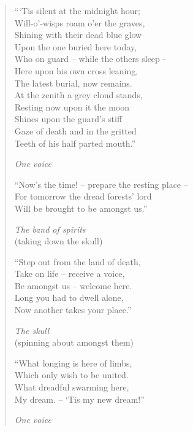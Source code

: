 \begin{verse}
``‘Tis silent at the midnight hour; \\
Will-o’-wisps roam o’er the graves, \\
Shining with their dead blue glow \\
Upon the one buried here today, \\
Who on guard -- while the others sleep - \\
Here upon his own cross leaning, \\
The latest burial, now remains. \\
At the zenith a grey cloud stands, \\
Resting now upon it the moon \\
Shines upon the guard’s stiff \\
Gaze of death and in the gritted \\
Teeth of his half parted mouth.”

\smallskip

\textit{One voice}

\smallskip

``Now’s the time! -- prepare the resting place -- \\
For tomorrow the dread forests’ lord \\
Will be brought to be amongst us.”

\smallskip

\textit{The band of spirits} \\
(taking down the skull) 

\smallskip

``Step out from the land of death, \\
Take on life -- receive a voice, \\
Be amongst us -- welcome here. \\
Long you had to dwell alone, \\
Now another takes your place.”

\smallskip

\textit{The skull} \\
(spinning about amongst them) 

\smallskip

``What longing is here of limbs, \\
Which only wish to be united. \\
What dreadful swarming here, \\
My dream. -- ‘Tis my new dream!”

\pagebreak

\textit{One voice}

\smallskip


\end{verse}
